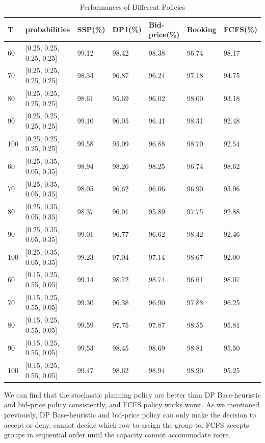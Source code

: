 \begin{table}[ht]
  \centering
  \caption{Performances of Different Policies}
  \begin{tabular}{|l|l|l|l|l|l|l|}
  \hline
   T & probabilities & SSP(\%) & DP1(\%) & Bid-price(\%) & Booking & FCFS(\%) \\
  \hline
   60  & [0.25, 0.25, 0.25, 0.25]  & 99.12 & 98.42 & 98.38 & 96.74 & 98.17 \\
   70  & [0.25, 0.25, 0.25, 0.25]  & 98.34 & 96.87 & 96.24 & 97.18 & 94.75 \\
   80  & [0.25, 0.25, 0.25, 0.25]  & 98.61 & 95.69 & 96.02 & 98.00 & 93.18 \\
   90  & [0.25, 0.25, 0.25, 0.25]  & 99.10 & 96.05 & 96.41 & 98.31 & 92.48 \\
   100 & [0.25, 0.25, 0.25, 0.25]  & 99.58 & 95.09 & 96.88 & 98.70 & 92.54 \\
   \hline
   60  & [0.25, 0.35, 0.05, 0.35]  & 98.94 & 98.26 & 98.25 & 96.74 & 98.62 \\
   70  & [0.25, 0.35, 0.05, 0.35]  & 98.05 & 96.62 & 96.06 & 96.90 & 93.96 \\
   80  & [0.25, 0.35, 0.05, 0.35]  & 98.37 & 96.01 & 95.89 & 97.75 & 92.88 \\
   90  & [0.25, 0.35, 0.05, 0.35]  & 99.01 & 96.77 & 96.62 & 98.42 & 92.46 \\
   100 & [0.25, 0.35, 0.05, 0.35]  & 99.23 & 97.04 & 97.14 & 98.67 & 92.00 \\
  \hline
  60  & [0.15, 0.25, 0.55, 0.05]  & 99.14 & 98.72 & 98.74 & 96.61 & 98.07 \\
  70  & [0.15, 0.25, 0.55, 0.05]  & 99.30 & 96.38 & 96.90 & 97.88 & 96.25 \\
  80  & [0.15, 0.25, 0.55, 0.05]  & 99.59 & 97.75 & 97.87 & 98.55 & 95.81 \\
  90  & [0.15, 0.25, 0.55, 0.05]  & 99.53 & 98.45 & 98.69 & 98.81 & 95.50 \\
  100 & [0.15, 0.25, 0.55, 0.05]  & 99.47 & 98.62 & 98.94 & 98.90 & 95.25 \\
  \hline
  \end{tabular}
\end{table}

We can find that the stochastic planning policy are better than DP Base-heuristic and bid-price policy consistently, and FCFS policy works worst. As we mentioned previously, DP Base-heuristic and bid-price policy can only make the decision to accept or deny, cannot decide which row to assign the group to. FCFS accepts groups in sequential order until the capacity cannot accommodate more.


